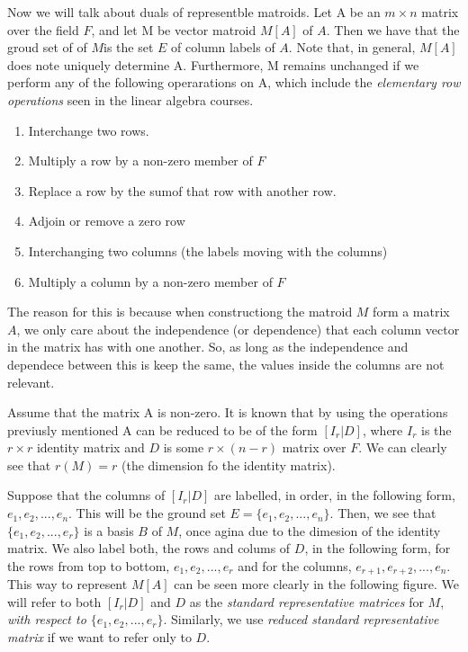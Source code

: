 Now we will talk about duals of representble matroids.
Let A be an $m \times n$ matrix over the field $F$, and let M be vector matroid $M[A]$ of $A$. Then we have that the groud set of  
of $M$is the set $E$ of column labels of $A$. Note that, in general, $M[A]$ does note uniquely determine A. Furthermore, M remains unchanged if we perform any of the following operarations on A, which include the \textit{elementary row operations} seen in the linear algebra courses.
\begin{enumerate}
    \item Interchange two rows.
    \item Multiply a row by a non-zero member of $F$
    \item Replace a row by the sumof that row with another row.
    \item Adjoin or remove a zero row
    \item Interchanging two columns (the labels moving with the columns)
    \item Multiply a column by a non-zero member of $F$
\end{enumerate}

The reason for this is because when constructiong the matroid $M$ form a matrix $A$, we only care about the independence (or dependence) that each column vector in the matrix has with one another. So, as long as the independence and dependece between this is keep the same, the values inside the columns are not relevant.

Assume that the matrix A is non-zero. It is known that by using the operations previusly mentioned A can be reduced to be of the form $[I_r|D]$, where $I_r$ is the $r \times r$ identity matrix and $D$ is some $r \times (n-r)$ matrix over $F$. We can clearly see that $r(M)=r$ (the dimension fo the identity matrix). 

Suppose that the columns of $[I_r|D]$ are labelled, in order, in the following form, $e_1, e_2,...,e_n$. This will be the ground set $E=\{e_1, e_2,...,e_n\}$. Then, we see that $\{e_1, e_2,...,e_r\}$ is a basis $B$ of $M$, once agina due to the dimesion of the identity matrix. We also label both, the rows and colums of $D$, in the following form, for the rows from top to bottom, $e_1, e_2,...,e_r$ and for the columns,  $e_{r+1}, e_{r+2},...,e_n$. This way to represent $M[A]$ can be seen more clearly in the following figure. We will refer to both $[I_r|D]$ and $D$ as the \textit{standard representative matrices} for $M$, \textit{with respect to $\{e_1, e_2,...,e_r\}$}. Similarly, we use \textit{reduced standard representative matrix} if we want to refer only to $D$.

